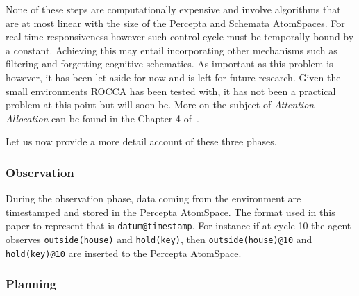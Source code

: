\documentclass[runningheads]{llncs}
\begin{document}
None of these steps are computationally expensive and involve
algorithms that are at most linear with the size of the Percepta and
Schemata AtomSpaces.  For real-time responsiveness however such
control cycle must be temporally bound by a constant.  Achieving this
may entail incorporating other mechanisms such as filtering and
forgetting cognitive schematics.  As important as this problem is
however, it has been let aside for now and is left for future
research.  Given the small environments ROCCA has been tested with, it
has not been a practical problem at this point but will soon be.  More
on the subject of \emph{Attention Allocation} can be found in the
Chapter 4 of~\cite{Goertzel2014EGI2}.

Let us now provide a more detail account of these three phases.

\subsubsection{Observation}
During the observation phase, data coming from the environment are
timestamped and stored in the Percepta AtomSpace.  The format used in
this paper to represent that is \texttt{datum@timestamp}.  For
instance if at cycle 10 the agent observes
\texttt{outside(house)} and
\texttt{hold(key)}, then \texttt{outside(house)@10} and
\texttt{hold(key)@10}
are inserted to the Percepta AtomSpace.

\subsubsection{Planning}
\end{document}
